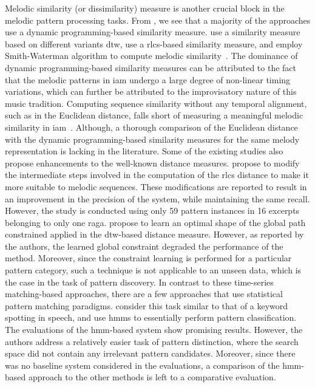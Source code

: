 Melodic similarity (or dissimilarity) measure is another crucial block in the melodic pattern processing tasks. From , we see that a majority of the approaches use a dynamic programming-based similarity measure. \cite{Ross2012,Ross2012b,rao2013distinguishing,Rao2014} use a similarity measure based on different variants \gls{dtw}, \cite{Ishwar2013,Dutta2014,dutta2014modified} use a \gls{rlcs}-based similarity measure, and \cite{ganguli2015efficient} employ Smith-Waterman algorithm to compute melodic similarity~\citep{smith1981identification}. The dominance of dynamic programming-based similarity measures can be attributed to the fact that the melodic patterns in \gls{iam} undergo a large degree of non-linear timing variations, which can further be attributed to the improvisatory nature of this music tradition. Computing sequence similarity without any temporal alignment, such as in the Euclidean distance, falls short of measuring a meaningful melodic similarity in \gls{iam}~\citep{Ross2012b}. Although, a thorough comparison of the Euclidean distance with the dynamic programming-based similarity measures for the same melody representation is lacking in the literature. Some of the existing studies also propose enhancements to the well-known distance measures. \cite{dutta2014modified} propose to modify the intermediate steps involved in the computation of the \gls{rlcs} distance to make it more suitable to melodic sequences. These modifications are reported to result in an improvement in the precision of the system, while maintaining the same recall. However, the study is conducted using only 59 pattern instances in 16 excerpts belonging to only one \gls{raga}. \cite{Rao2014} propose to learn an optimal shape of the global path constrained applied in the \gls{dtw}-based distance measure. However, as reported by the authors, the learned global constraint degraded the performance of the method. Moreover, since the constraint learning is performed for a particular pattern category, such a technique is not applicable to an unseen data, which is the case in the task of pattern discovery. In contrast to these time-series matching-based approaches, there are a few approaches that use statistical pattern matching paradigms. \cite{ishwar2012motivic,Rao2014} consider this task similar to that of a keyword spotting in speech, and use \glspl{hmm} to essentially perform pattern classification. The evaluations of the \gls{hmm}-based system show promising results. However, the authors address a relatively easier task of pattern distinction, where the search space did not contain any irrelevant pattern candidates. Moreover, since there was no baseline system considered in the evaluations, a comparison of the \gls{hmm}-based approach to the other methods is left to a comparative evaluation.

